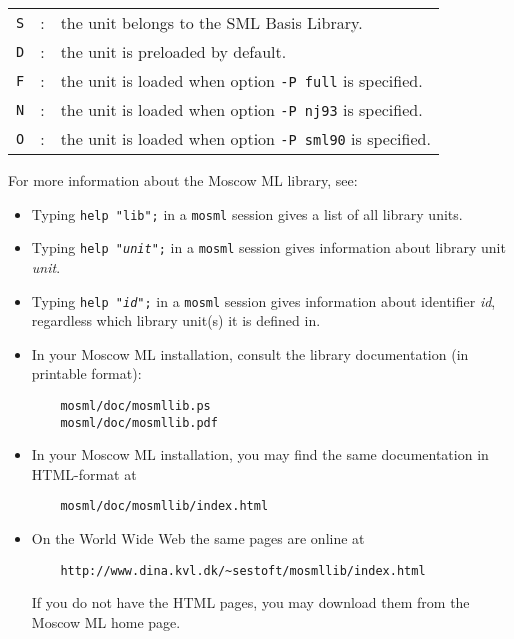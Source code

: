 \documentclass[fleqn]{article}
\begin{document}
\begin{center}
\begin{tabular}{lcl}
{\tt S} & : & the unit belongs to the SML Basis Library.\\

{\tt D} & : & the unit is preloaded by default.\\

{\tt F} & : & the unit is loaded when option {\tt -P full}
  is specified.\\

{\tt N} & : &  the unit is loaded when option {\tt -P nj93}
  is specified.\\

{\tt O} & : & the unit is loaded when option {\tt -P sml90}
  is specified.
\end{tabular}
\end{center}

\noindent For more information about the Moscow ML library, see:

\begin{itemize}

\item Typing {\tt help "lib";} in a {\tt mosml} session gives a list of
  all library units.

\item Typing {\tt help "{\it unit\/}";} in a {\tt mosml} session gives
  information about library unit {\it unit\/}.

\item Typing {\tt help "{\it id\/}";} in a {\tt mosml} session gives
  information about identifier {\it id\/}, regardless which library
  unit(s) it is defined in.

\item In your Moscow ML installation, consult the library documentation 
(in printable format):
\begin{verbatim}
    mosml/doc/mosmllib.ps
    mosml/doc/mosmllib.pdf
\end{verbatim}

\item In your Moscow ML installation, you may find the same documentation
  in HTML-format at 

\begin{verbatim}
    mosml/doc/mosmllib/index.html
\end{verbatim}

\item On the World Wide Web the same pages are online at

\begin{verbatim}
    http://www.dina.kvl.dk/~sestoft/mosmllib/index.html
\end{verbatim}
  
  If you do not have the HTML pages, you may download them from the
  Moscow ML home page.
\end{itemize}
\end{document}
